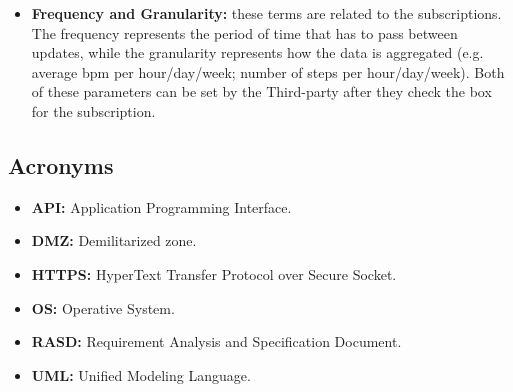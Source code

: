 \begin{itemize}
            \item \textbf{Frequency and Granularity:} these terms are related to the subscriptions. The frequency represents the period of time that has to pass between updates, while the granularity represents how the data is aggregated (e.g. average bpm per hour/day/week; number of steps per hour/day/week). Both of these parameters can be set by the Third-party after they check the box for the subscription.
        \end{itemize}
    
    \subsection{Acronyms}
        \begin{itemize}
            \item \textbf{API:} Application Programming Interface.
            
            \item \textbf{DMZ:} Demilitarized zone.

            \item \textbf{HTTPS:} HyperText Transfer Protocol over Secure Socket.

            \item \textbf{OS:} Operative System.

            \item \textbf{RASD:} Requirement Analysis and Specification Document.
            
            \item \textbf{UML:} Unified Modeling Language.
        \end{itemize}
        

